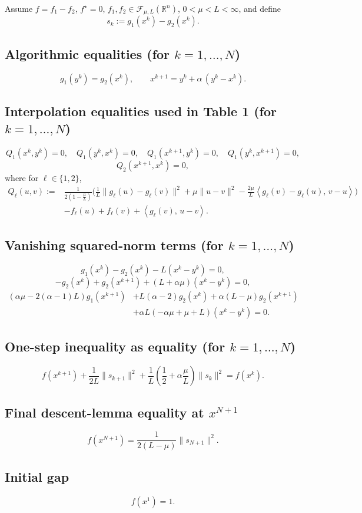 \documentclass{article} %
\begin{document}
{Assume $f=f_1-f_2$, $f^\star=0$, $f_1,f_2\in\mathcal{F}_{\mu,L}(\mathbb{R}^n)$, $0<\mu<L<\infty$, and define
\[
s_k := g_1(x^k)-g_2(x^k).
\]

\subsection*{Algorithmic equalities (for $k=1,\dots,N$)}
\[
g_1(y^k)=g_2(x^k),
\qquad
x^{k+1}=y^k+\alpha\,(y^k-x^k).
\]

\subsection*{Interpolation equalities used in Table 1 (for $k=1,\dots,N$)}
\[
Q_1(x^k,y^k)=0,\quad Q_1(y^k,x^k)=0,\quad Q_1(x^{k+1},y^k)=0,\quad Q_1(y^k,x^{k+1})=0,
\]
\[
Q_2(x^{k+1},x^k)=0,
\]
where for $\ell\in\{1,2\}$,
\[
\begin{aligned}
Q_\ell(u,v):={}&
\frac{1}{2\left(1-\frac{\mu}{L}\right)}
\Bigg(
\frac{1}{L}\bigl\|g_\ell(u)-g_\ell(v)\bigr\|^2
+\mu\|u-v\|^2
-\frac{2\mu}{L}\left\langle g_\ell(v)-g_\ell(u),\,v-u\right\rangle
\Bigg)\\
&- f_{\ell}(u)+f_{\ell}(v)+\left\langle g_{\ell}(v),\, u-v\right\rangle .
\end{aligned}
\]

\subsection*{Vanishing squared-norm terms (for $k=1,\dots,N$)}
\[
g_1(x^k)-g_2(x^k)-L(x^k-y^k)=0,
\]
\[
-g_2(x^k)+g_2(x^{k+1})+(L+\alpha\mu)(x^k-y^k)=0,
\]
\[
\begin{aligned}
(\alpha  \mu -2 (\alpha -1) L)g_1(x^{k+1})
&+L(\alpha-2)g_2(x^k)+\alpha(L-\mu)g_2(x^{k+1})\\
&+\alpha  L (-\alpha  \mu +\mu +L)(x^k-y^k)=0.
\end{aligned}
\]

\subsection*{One-step inequality as equality (for $k=1,\dots,N$)}
\[
f(x^{k+1})+\frac{1}{2L}\|s_{k+1}\|^2
+\frac{1}{L}\left(\frac12+\alpha\frac{\mu}{L}\right)\|s_k\|^2
= f(x^k).
\]

\subsection*{Final descent-lemma equality at $x^{N+1}$}
\[
f(x^{N+1})=\frac{1}{2(L-\mu)}\|s_{N+1}\|^2.
\]

\subsection*{Initial gap}
\[
f(x^1)=1.
\]

}
\end{document}
